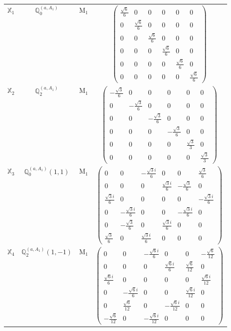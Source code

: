 \documentclass[fleqn,10pt,landscape]{article}
\begin{document}
\begin{itemize}
\begin{center}
\begin{longtable}{c|c|c|c}
$ \mathbb{X}_{1} $ & $\mathbb{Q}_{0}^{(a,A_{1})}$ & M$_{1}$ & $\begin{pmatrix} \frac{\sqrt{6}}{6} & 0 & 0 & 0 & 0 & 0 \\ 0 & \frac{\sqrt{6}}{6} & 0 & 0 & 0 & 0 \\ 0 & 0 & \frac{\sqrt{6}}{6} & 0 & 0 & 0 \\ 0 & 0 & 0 & \frac{\sqrt{6}}{6} & 0 & 0 \\ 0 & 0 & 0 & 0 & \frac{\sqrt{6}}{6} & 0 \\ 0 & 0 & 0 & 0 & 0 & \frac{\sqrt{6}}{6} \end{pmatrix}$ \\
$ \mathbb{X}_{2} $ & $\mathbb{Q}_{2}^{(a,A_{1})}$ & M$_{1}$ & $\begin{pmatrix} - \frac{\sqrt{3}}{6} & 0 & 0 & 0 & 0 & 0 \\ 0 & - \frac{\sqrt{3}}{6} & 0 & 0 & 0 & 0 \\ 0 & 0 & - \frac{\sqrt{3}}{6} & 0 & 0 & 0 \\ 0 & 0 & 0 & - \frac{\sqrt{3}}{6} & 0 & 0 \\ 0 & 0 & 0 & 0 & \frac{\sqrt{3}}{3} & 0 \\ 0 & 0 & 0 & 0 & 0 & \frac{\sqrt{3}}{3} \end{pmatrix}$ \\
$ \mathbb{X}_{3} $ & $\mathbb{Q}_{0}^{(a,A_{1})}(1,1)$ & M$_{1}$ & $\begin{pmatrix} 0 & 0 & - \frac{\sqrt{3} i}{6} & 0 & 0 & \frac{\sqrt{3}}{6} \\ 0 & 0 & 0 & \frac{\sqrt{3} i}{6} & - \frac{\sqrt{3}}{6} & 0 \\ \frac{\sqrt{3} i}{6} & 0 & 0 & 0 & 0 & - \frac{\sqrt{3} i}{6} \\ 0 & - \frac{\sqrt{3} i}{6} & 0 & 0 & - \frac{\sqrt{3} i}{6} & 0 \\ 0 & - \frac{\sqrt{3}}{6} & 0 & \frac{\sqrt{3} i}{6} & 0 & 0 \\ \frac{\sqrt{3}}{6} & 0 & \frac{\sqrt{3} i}{6} & 0 & 0 & 0 \end{pmatrix}$ \\
$ \mathbb{X}_{4} $ & $\mathbb{Q}_{2}^{(a,A_{1})}(1,-1)$ & M$_{1}$ & $\begin{pmatrix} 0 & 0 & - \frac{\sqrt{6} i}{6} & 0 & 0 & - \frac{\sqrt{6}}{12} \\ 0 & 0 & 0 & \frac{\sqrt{6} i}{6} & \frac{\sqrt{6}}{12} & 0 \\ \frac{\sqrt{6} i}{6} & 0 & 0 & 0 & 0 & \frac{\sqrt{6} i}{12} \\ 0 & - \frac{\sqrt{6} i}{6} & 0 & 0 & \frac{\sqrt{6} i}{12} & 0 \\ 0 & \frac{\sqrt{6}}{12} & 0 & - \frac{\sqrt{6} i}{12} & 0 & 0 \\ - \frac{\sqrt{6}}{12} & 0 & - \frac{\sqrt{6} i}{12} & 0 & 0 & 0 \end{pmatrix}$ \\

\end{longtable}
\end{center}
\end{itemize}
\end{document}
